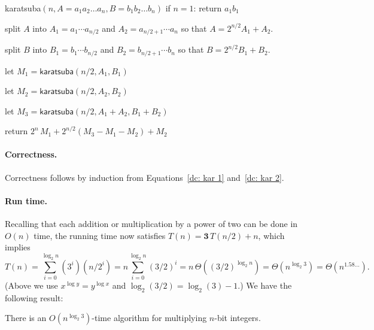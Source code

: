 \begin{myframed}
\begin{steps}
  \item[] {\sf karatsuba}$(n, A=a_1a_2\ldots a_n, B=b_1 b_2 \ldots b_n)$
    \step if $n = 1$: return $a_{1} b_{1}$

    \step split $A$ into $A_1 = a_1 \cdots a_{n/2}$ and $A_2 = a_{n/2+1} \cdots a_n$
    so that \(A = 2^{n/2} A_1 + A_2\).

    \step split $B$ into $B_1 = b_1 \cdots b_{n/2}$ and $B_2 = b_{n/2+1} \cdots b_n$
    so that \(B = 2^{n/2} B_1 + B_2\).

    \step let $M_{1} = \textsf{karatsuba}(n/2, A_1, B_1)$
    
    \step let $M_{2} = \textsf{karatsuba}(n/2, A_2, B_2)$

    \step let $M_{3} = \textsf{karatsuba}(n/2, A_1 + A_2, B_1 + B_2)$
    
    \step return $2^{n}\, M_1 + 2^{n/2}(M_3 - M_1 - M_2) + M_2$
  \end{steps}
\end{myframed}

\paragraph{Correctness.}
Correctness follows by induction from Equations~\eqref{dc: kar 1} and~\eqref{dc: kar 2}.

\paragraph{Run time.}
Recalling that each addition or multiplication by a power of two
can be done in $O(n)$ time,
the running time now satisfies $T(n) = \mathbf{3}\, T(n/2) + n$,
which implies
\[
  T(n) = \sum_{i=0}^ {\log_2 n} (3^i) (n/2^i)
  = n \sum_{i=0}^{\log_2 n} (3/2)^i
  = n\, \Theta((3/2)^{\log_2 n})
  = \Theta(n^{\log_2 3})
  = \Theta(n^{1.58\ldots}). 
\]
(Above we use $x^{\log y} = y^{\log x}$ and $\log_2 (3/2) = \log_2(3) - 1$.) 
We have the following result:
\begin{theorem}[Karatsuba]
  There is an $O(n^{\log_2 3})$-time algorithm
  for multiplying $n$-bit integers.
\end{theorem}

